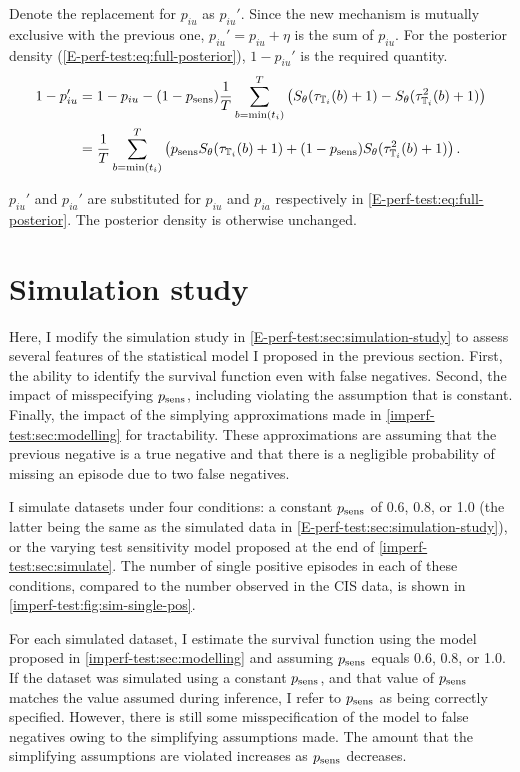 \documentclass[thesis.tex]{subfiles}
\begin{document}
Denote the replacement for $p_{iu}$ as $p_{iu}'$.
Since the new mechanism is mutually exclusive with the previous one, $p_{iu}' = p_{iu} + \eta$ is the sum of $p_{iu}$.
For the posterior density (\cref{E-perf-test:eq:full-posterior}), $1 - p_{iu}'$ is the required quantity.
\begin{align}
1 - p_{iu}'
&= 1 - p_{iu} - (1 - p_\text{sens})\frac{1}{T} \sum_{b=\min(t_i)}^T \left( S_\theta(\tau_{\mathbb{T}_i}(b) + 1) - S_\theta(\tau^2_{\mathbb{T}_i}(b) + 1) \right) \\
&= \frac{1}{T} \sum_{b=\min(t_i)}^T \left( p_\text{sens} S_\theta(\tau_{\mathbb{T}_i}(b) + 1) + (1 - p_\text{sens}) S_\theta(\tau^2_{\mathbb{T}_i}(b) + 1)\right).
\label{imperf-test:eq:pit-prime}
\end{align}

$p_{iu}'$ and $p_{ia}'$ are substituted for $p_{iu}$ and $p_{ia}$ respectively in \cref{E-perf-test:eq:full-posterior}.
The posterior density is otherwise unchanged.

\section{Simulation study} \label{imperf-test:sec:sim-study-results}

Here, I modify the simulation study in \cref{E-perf-test:sec:simulation-study} to assess several features of the statistical model I proposed in the previous section.
First, the ability to identify the survival function even with false negatives.
Second, the impact of misspecifying $p_\text{sens}$, including violating the assumption that is constant.
Finally, the impact of the simplying approximations made in \cref{imperf-test:sec:modelling} for tractability.
These approximations are assuming that the previous negative is a true negative and that there is a negligible probability of missing an episode due to two false negatives.

I simulate datasets under four conditions: a constant $p_\text{sens}$ of 0.6, 0.8, or 1.0 (the latter being the same as the simulated data in \cref{E-perf-test:sec:simulation-study}), or the varying test sensitivity model proposed at the end of \cref{imperf-test:sec:simulate}.
The number of single positive episodes in each of these conditions, compared to the number observed in the CIS data, is shown in \cref{imperf-test:fig:sim-single-pos}.

For each simulated dataset, I estimate the survival function using the model proposed in \cref{imperf-test:sec:modelling} and assuming $p_\text{sens}$ equals 0.6, 0.8, or 1.0.
If the dataset was simulated using a constant $p_\text{sens}$, and that value of $p_\text{sens}$ matches the value assumed during inference, I refer to $p_\text{sens}$ as being correctly specified.
However, there is still some misspecification of the model to false negatives owing to the simplifying assumptions made.
The amount that the simplifying assumptions are violated increases as $p_\text{sens}$ decreases.
\end{document}
